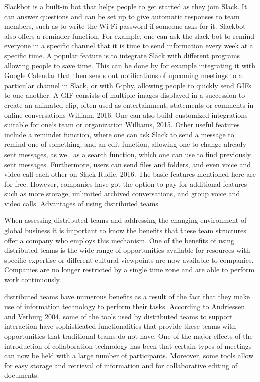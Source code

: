 Slackbot is a built-in bot that helps people to get started as they join Slack. It can answer questions and can be set up to give automatic responses to team members, such as to write the Wi-Fi password if someone asks for it. Slackbot also offers a reminder function. For example, one can ask the slack bot to remind everyone in a specific channel that it is time to send information every week at a specific time.
A popular feature is to integrate Slack with different programs allowing people to save time. This can be done by for example integrating it with Google Calendar that then sends out notifications of upcoming meetings to a particular channel in Slack, or with Giphy, allowing people to quickly send GIFs to one another. A GIF consists of multiple images displayed in a succession to create an animated clip, often used as entertainment, statements or comments in online conversations William, 2016.
One can also build customized integrations suitable for one‘s team or organization Williams, 2015. Other useful features include a reminder function, where one can ask Slack to send a message to remind one of something, and an edit function, allowing one to change already sent messages, as well as a search function, which one can use to find previously sent messages. Furthermore, users can send files and folders, and even voice and video call each other on Slack Rudic, 2016. The basic features mentioned here are for free. However, companies have got the option to pay for additional features such as more storage, unlimited archived conversations, and group voice and video calls.
Advantages of using distributed teams

When assessing distributed teams and addressing the changing environment of global business it is important to know the benefits that these team structures offer a company who employs this mechanism. One of the benefits of using distributed teams is the wide range of opportunities available for resources with specific expertise or different cultural viewpoints are now available to companies. Companies are no longer restricted by a single time zone and are able to perform work continuously.

distributed teams have numerous benefits as a result of the fact that they make use of information technology to perform their tasks. According to Andriessen and Verburg 2004, some of the tools used by distributed teams to support interaction have sophisticated functionalities that provide these teams with opportunities that traditional teams do not have. One of the major effects of the introduction of collaboration technology has been that certain types of meetings can now be held with a large number of participants. Moreover, some tools allow for easy storage and retrieval of information and for collaborative editing of documents.

